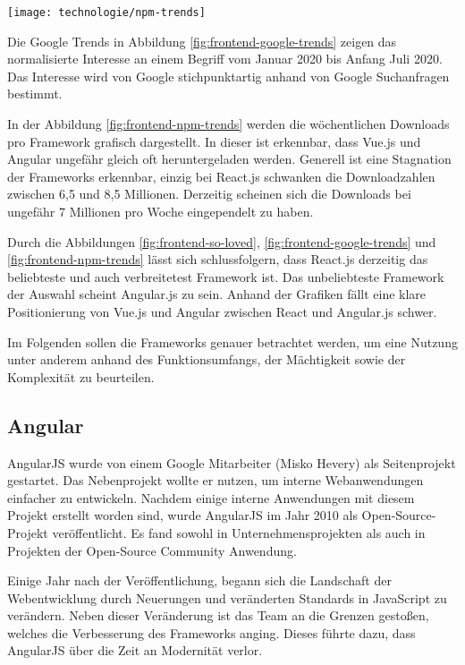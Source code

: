 \begin{center}
	\texttt{[image: technologie/npm-trends]}
	\label{fig:frontend-npm-trends}
\end{center}

Die Google Trends in Abbildung \ref{fig:frontend-google-trends} zeigen das normalisierte Interesse an einem Begriff vom Januar 2020 bis Anfang Juli 2020. Das Interesse wird von Google stichpunktartig anhand von Google Suchanfragen bestimmt. \cite{googleHaufigGestellteFragen2020}

In der Abbildung \ref{fig:frontend-npm-trends} werden die wöchentlichen Downloads pro Framework grafisch dargestellt. In dieser ist erkennbar, dass Vue.js und Angular ungefähr gleich oft heruntergeladen werden. Generell ist eine Stagnation der Frameworks erkennbar, einzig bei React.js schwanken die Downloadzahlen zwischen 6,5 und 8,5 Millionen. Derzeitig scheinen sich die Downloads bei ungefähr 7 Millionen pro Woche eingependelt zu haben.

Durch die Abbildungen \ref{fig:frontend-so-loved}, \ref{fig:frontend-google-trends} und \ref{fig:frontend-npm-trends} lässt sich schlussfolgern, dass React.js derzeitig das beliebteste und auch verbreitetest Framework ist. Das unbeliebteste Framework der Auswahl scheint Angular.js zu sein. Anhand der Grafiken fällt eine klare Positionierung von Vue.js und Angular zwischen React und Angular.js schwer.

Im Folgenden sollen die Frameworks genauer betrachtet werden, um eine Nutzung unter anderem anhand des Funktionsumfangs, der Mächtigkeit sowie der Komplexität zu beurteilen.

\subsection{Angular}
AngularJS wurde von einem Google Mitarbeiter (Misko Hevery) als Seitenprojekt gestartet. Das Nebenprojekt wollte er nutzen, um interne Webanwendungen einfacher zu entwickeln. Nachdem einige interne Anwendungen mit diesem Projekt erstellt worden sind, wurde AngularJS im Jahr 2010 als Open-Source-Projekt veröffentlicht. Es fand sowohl in Unternehmensprojekten als auch in Projekten der Open-Source Community Anwendung.

Einige Jahr nach der Veröffentlichung, begann sich die Landschaft der Webentwicklung durch Neuerungen und veränderten Standards in JavaScript zu verändern. Neben dieser Veränderung ist das Team an die Grenzen gestoßen, welches die Verbesserung des Frameworks anging. Dieses führte dazu, dass AngularJS über die Zeit an Modernität verlor.

